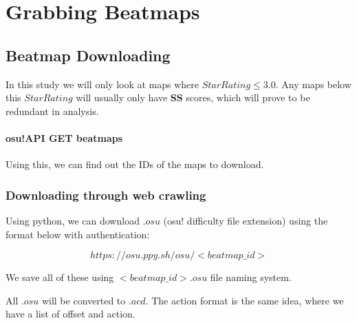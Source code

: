 

\section{Grabbing Beatmaps}

\subsection{Beatmap Downloading}

In this study we will only look at maps where $ Star Rating \leq 3.0 $. Any maps below this $Star Rating$ will usually only have \textbf{SS} scores, which will prove to be redundant in analysis.

\paragraph{osu!API GET beatmaps} Using this, we can find out the IDs of the maps to download.

\subsubsection{Downloading through web crawling}

Using python, we can download $.osu$ (osu! difficulty file extension) using the format below with authentication:

$$https://osu.ppy.sh/osu/<beatmap\_id>$$

We save all of these using $<beatmap\_id>.osu$ file naming system.

All $.osu$ will be converted to $.acd$. The action format is the same idea, where we have a list of offset and action.


